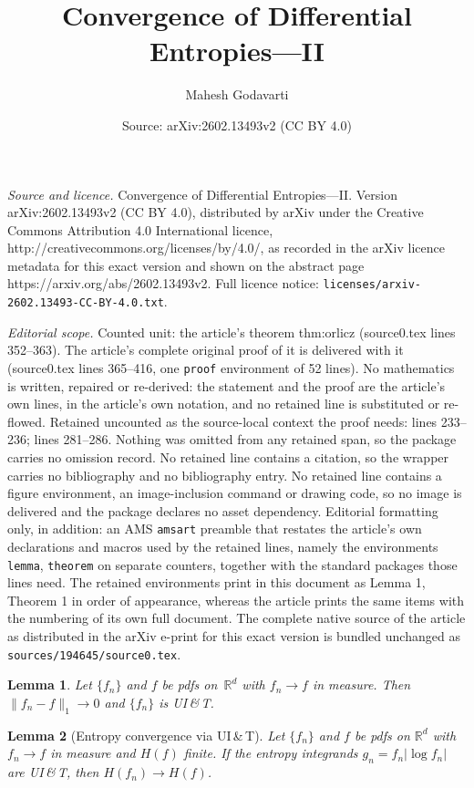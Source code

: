 \documentclass[10pt,a4paper]{amsart}
\title{Convergence of Differential Entropies---{II}}
\author{Mahesh Godavarti}
\date{Source: arXiv:2602.13493v2 (CC BY 4.0)}
\newtheorem{lemma}{Lemma}
\newcommand{\Hent}{H}
\newcommand{\Rd}{\mathbb{R}^d}
\newcommand{\abs}[1]{\lvert #1 \rvert}
\newcommand{\norm}[1]{\lVert #1 \rVert}
\begin{document}
\maketitle

\noindent\emph{Source and licence.} Convergence of Differential Entropies---{II}. Version arXiv:2602.13493v2 (CC BY 4.0), distributed by arXiv under the Creative Commons Attribution 4.0 International licence, http://creativecommons.org/licenses/by/4.0/, as recorded in the arXiv licence metadata for this exact version and shown on the abstract page https://arxiv.org/abs/2602.13493v2. Full licence notice: \texttt{licenses/arxiv-2602.13493-CC-BY-4.0.txt}.\par\smallskip

\noindent\textit{Editorial scope.} Counted unit: the article's theorem thm:orlicz (source0.tex lines 352--363). The article's complete original proof of it is delivered with it (source0.tex lines 365--416, one \texttt{proof} environment of 52 lines). No mathematics is written, repaired or re-derived: the statement and the proof are the article's own lines, in the article's own notation, and no retained line is substituted or re-flowed.  Retained uncounted as the source-local context the proof needs: lines 233--236; lines 281--286.  Nothing was omitted from any retained span, so the package carries no omission record.  No retained line contains a citation, so the wrapper carries no bibliography and no bibliography entry.  No retained line contains a figure environment, an image-inclusion command or drawing code, so no image is delivered and the package declares no asset dependency.  Editorial formatting only, in addition: an AMS \texttt{amsart} preamble that restates the article's own declarations and macros used by the retained lines, namely the environments \texttt{lemma}, \texttt{theorem} on separate counters, together with the standard packages those lines need.  The retained environments print in this document as Lemma 1, Theorem 1 in order of appearance, whereas the article prints the same items with the numbering of its own full document.  The complete native source of the article as distributed in the arXiv e-print for this exact version is bundled unchanged as \texttt{sources/194645/source0.tex}.
\begin{lemma}\label{lem:density-UIT}
Let $\{f_n\}$ and $f$ be pdfs on~$\Rd$ with $f_n \to f$ in measure.
Then $\norm{f_n - f}_1 \to 0$ and $\{f_n\}$ is UI\,\&\,T.
\end{lemma}

\begin{lemma}[Entropy convergence via UI\,\&\,T]\label{thm:NS}
Let $\{f_n\}$ and $f$ be pdfs on $\Rd$ with $f_n \to f$ in measure
and $\Hent(f)$ finite.  If the entropy integrands
$g_n = f_n \abs{\log f_n}$ are UI\,\&\,T, then
$\Hent(f_n) \to \Hent(f)$.
\end{lemma}
\end{document}
